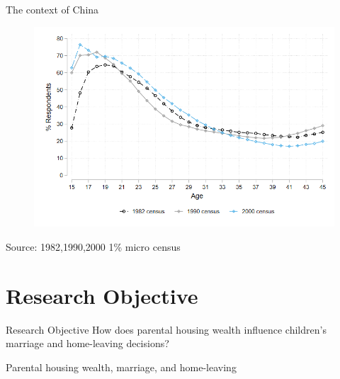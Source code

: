 \documentclass{beamer}
\begin{document}
\begin{frame}{The context of China}
     \setlength\itemsep{1em}
    \begin{figure}
    \includegraphics[width=0.9\linewidth, height=0.5\linewidth]{extended.png}
    \centering
    \end{figure}
    \tiny {Source: 1982,1990,2000 1\% micro census}
\end {frame}

\section{Research Objective}

\begin{frame}{Research Objective}
How does parental housing wealth influence children's marriage and home-leaving decisions? 
    
\end{frame}

\begin{frame}{Parental housing wealth, marriage, and home-leaving}

    
\end{frame}

\end{document}
